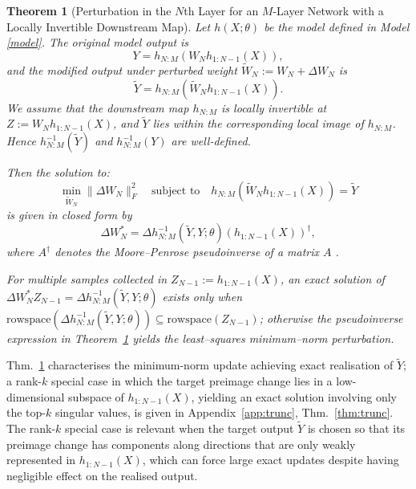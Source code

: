 \documentclass{article}
\theoremstyle{plain}
\newtheorem{theorem}{Theorem}[section]
\theoremstyle{definition}
\theoremstyle{remark}
\newtheorem{remark}[theorem]{Remark}
\begin{document}

\begin{theorem}[Perturbation in the $N$th Layer for an $M$-Layer Network with a Locally Invertible Downstream Map]\label{thm:invertible-activation}
Let $h(X;\theta)$ be the model defined in Model \ref{model}. The original model output is
\[
Y = h_{N:M}( W_N h_{1:N-1}(X)),
\]
and the modified output under perturbed weight $\tilde W_N := W_N + \Delta W_N$ is
\[
\tilde Y = h_{N:M}( \tilde W_N h_{1:N-1}(X)).
\]
We assume that the downstream map \(h_{N:M}\) is locally invertible at \(Z := W_N h_{1:N-1}(X)\), and \(\tilde Y\) lies within the corresponding local image of \(h_{N:M}\).  
Hence \(h_{N:M}^{-1}(\tilde Y)\) and \(h_{N:M}^{-1}(Y)\) are well-defined.

Then the solution to:
\[
\min_{\tilde W_N} \|\Delta W_N\|_F^2 
\quad\text{subject to}\quad h_{N:M}( \tilde W_N h_{1:N-1}(X))=\tilde Y
\]
is given in closed form by
\begin{equation}
\label{thm1}
\boxed{\Delta W_N^\ast = 
 \Delta h_{N:M}^{-1}(\tilde Y, Y;\theta) (h_{1:N-1}(X))^\dagger,}
\end{equation}
where \(A^\dagger\) denotes the Moore--Penrose pseudoinverse of a matrix \(A\) \cite{golub_matrix_1996}.

For multiple samples collected in
$Z_{N-1}:=h_{1:N-1}(X)$,
an exact solution of $\Delta W_N^\ast Z_{N-1}=\Delta h_{N:M}^{-1}(\tilde Y, Y;\theta)$
exists only when
$\mathrm{rowspace}(\Delta h_{N:M}^{-1}(\tilde Y, Y;\theta))\subseteq\mathrm{rowspace}(Z_{N-1})$;
otherwise the pseudoinverse expression in
Theorem~\ref{thm:invertible-activation}
yields the least--squares minimum--norm perturbation.
\end{theorem}




Thm.~\ref{thm:invertible-activation} characterises the minimum-norm update achieving exact realisation of $\tilde Y$; a rank-$k$ special case in which the target preimage change lies in a low-dimensional subspace of $h_{1:N-1}(X)$, yielding an exact solution involving only the top-$k$ singular values, is given in Appendix~\ref{app:trunc}, Thm.~\ref{thm:trunc}. The rank-$k$ special case is relevant when the target output $\tilde Y$ is chosen so that its preimage change has components along directions that are only weakly represented in $h_{1:N-1}(X)$, which can force large exact updates despite having negligible effect on the realised output.
\end{document}

